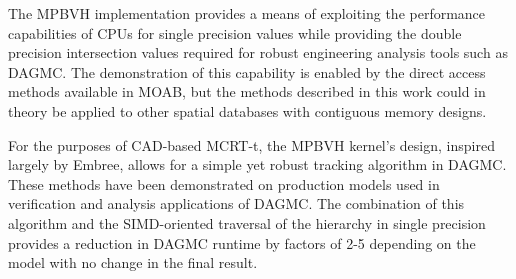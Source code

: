 The MPBVH implementation provides a means of exploiting the performance
capabilities of CPUs for single precision values while providing the double
precision intersection values required for robust engineering analysis tools
such as DAGMC. The demonstration of this capability is enabled by the direct
access methods available in MOAB, but the methods described in this work could
in theory be applied to other spatial databases with contiguous memory designs.

For the purposes of CAD-based MCRT-t, the MPBVH kernel's design, inspired largely
by Embree, allows for a simple yet robust tracking algorithm in DAGMC. These
methods have been demonstrated on production models used in verification and
analysis applications of DAGMC. The combination of this algorithm and the
SIMD-oriented traversal of the hierarchy in single precision provides a
reduction in DAGMC runtime by factors of 2-5 depending on the model with no
change in the final result.
